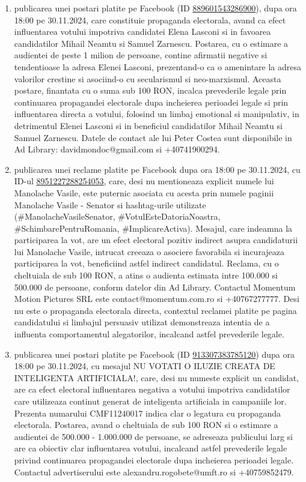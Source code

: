 \documentclass[a4paper,12pt]{article}
\begin{document}
\begin{enumerate}[leftmargin=*, label=\arabic*.)]
    \item publicarea unei postari platite pe Facebook (ID \href{https://www.facebook.com/ads/library/?id=889601543286900}{889601543286900}), dupa ora 18:00 pe 30.11.2024, care constituie propaganda electorala, avand ca efect influentarea votului impotriva candidatei Elena Lasconi si in favoarea candidatilor Mihail Neamtu si Samuel Zarnescu. Postarea, cu o estimare a audientei de peste 1 milion de persoane, contine afirmatii negative si tendentioase la adresa Elenei Lasconi, prezentand-o ca o amenintare la adresa valorilor crestine si asociind-o cu secularismul si neo-marxismul.  Aceasta postare, finantata cu o suma sub 100 RON,  incalca prevederile legale prin continuarea propagandei electorale dupa incheierea perioadei legale si prin influentarea directa a votului,  folosind un limbaj emotional si manipulativ,  in detrimentul Elenei Lasconi si in beneficiul candidatilor Mihail Neamtu si Samuel Zarnescu.  Datele de contact ale lui Peter Costea sunt disponibile in Ad Library: davidmondoc@gmail.com si +40741900294.
    \item publicarea unei reclame platite pe Facebook dupa ora 18:00 pe 30.11.2024, cu ID-ul \href{https://www.facebook.com/ads/library/?id=8951227288254053}{8951227288254053}, care, desi nu mentioneaza explicit numele lui Manolache Vasile, este puternic asociata cu acesta prin numele paginii Manolache Vasile - Senator si hashtag-urile utilizate (\#ManolacheVasileSenator, \#VotulEsteDatoriaNoastra, \#SchimbarePentruRomania, \#ImplicareActiva).  Mesajul, care indeamna la participarea la vot, are un efect electoral pozitiv indirect asupra candidaturii lui Manolache Vasile, intrucat creeaza o asociere favorabila si incurajeaza participarea la vot, beneficiind astfel indirect candidatul.  Reclama, cu o cheltuiala de sub 100 RON, a atins o audienta estimata intre 100.000 si 500.000 de persoane, conform datelor din Ad Library.  Contactul Momentum Motion Pictures SRL este contact@momentum.com.ro si +40767277777.  Desi nu este o propaganda electorala directa, contextul reclamei platite pe pagina candidatului si limbajul persuasiv utilizat demonstreaza intentia de a influenta comportamentul alegatorilor, incalcand astfel prevederile legale.
    \item publicarea unei postari platite pe Facebook (ID \href{https://www.facebook.com/ads/library/?id=913307383785120}{913307383785120}) dupa ora 18:00 pe 30.11.2024, cu mesajul  NU VOTATI O ILUZIE CREATA DE INTELIGENTA ARTIFICIALA!,  care, desi nu numeste explicit un candidat, are ca efect electoral influentarea negativa a votului impotriva candidatilor care utilizeaza continut generat de inteligenta artificiala in campaniile lor.  Prezenta numarului CMF11240017 indica clar o legatura cu propaganda electorala.  Postarea, avand o cheltuiala de sub 100 RON si o estimare a audientei de 500.000 - 1.000.000 de persoane,  se adreseaza publicului larg si are ca obiectiv clar influentarea votului, incalcand astfel prevederile legale privind continuarea propagandei electorale dupa incheierea perioadei legale.  Contactul advertiserului este alexandru.rogobete@umft.ro si +40759852479.

\end{enumerate}
\end{document}
